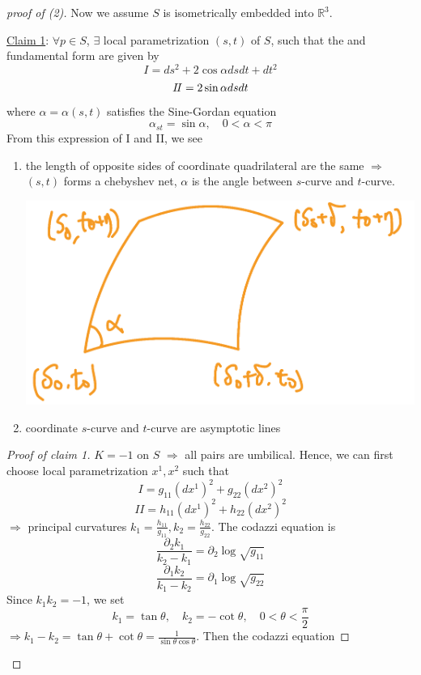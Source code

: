 \begin{proof}[proof of (2)]
    Now we assume \(S\) is isometrically embedded into \(\mathbb{R}^3\).

    \underline{Claim 1}: \(\forall p\in S\), \(\exists\) local parametrization
    \((s,t)\) of \(S\), such that the  and 
     fundamental form are given by
    \[
      I=ds^2+2\cos \alpha ds dt +dt^2  
    \]   
    \[I\!I=2\sin\alpha ds dt\]
    where \(\alpha=\alpha(s,t)\) satisfies the Sine-Gordan equation
    \[\alpha_{st}=\sin \alpha,\quad 0<\alpha<\pi\]
    From this expression of I and II, we see
    \begin{enumerate}[(1)]
        \item the length of opposite sides of coordinate quadrilateral
        are the same \(\Rightarrow\) \((s,t)\) forms a chebyshev net,
        \(\alpha\) is the angle between \(s\)-curve and \(t\)-curve.
        \begin{center}
            \includegraphics[scale=0.2]{picture/week15/quadrilateral.png}
        \end{center}
        \item coordinate \(s\)-curve and \(t\)-curve are asymptotic lines
    \end{enumerate}
    \begin{proof}[Proof of claim 1]
        \(K=-1\) on \(S\) \(\Rightarrow\) all pairs are umbilical.
        Hence, we can first choose local parametrization \(x^1,x^2\)
        such that 
        \[I=g_{11}(dx^1)^2+g_{22}(dx^2)^2\]
        \[II=h_{11}(dx^1)^2+h_{22}(dx^2)^2\]
    \(\Rightarrow\) principal curvatures \(k_1=\frac{h_{11}}{g_{11}},
    k_2=\frac{h_{22}}{g_{22}}\).
    The codazzi equation is 
    \[\frac{\partial_2k_1}{k_2-k_1}=\partial_2 \log \sqrt{g_{11}}\]
    \[\frac{\partial_1k_2}{k_1-k_2}=\partial_1 \log \sqrt{g_{22}}\]
    Since \(k_1k_2=-1\), we set 
    \[
        k_1=\tan\theta,\quad k_2=-\cot\theta,\quad 0<\theta<\frac{\pi}{2}    
    \]
    \(\Rightarrow k_1-k_2=\tan\theta+\cot \theta=
    \frac{1}{\sin\theta\cos\theta}\).
    Then the codazzi equation 
    \end{proof}
\end{proof}
